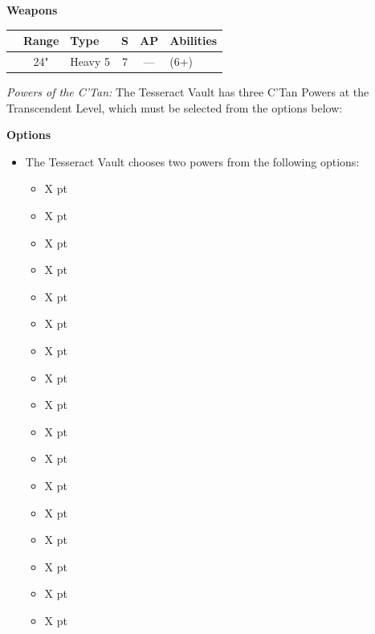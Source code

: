 \begin{minipage}[t]{0.72\textwidth}
	
	\vspace*{2em}
	\textbf{Weapons}
	
	\begin{tabular}{L{90 pt} c C{40pt} *{2}{c} >{\raggedright\arraybackslash}p{130pt}}
		& Range & Type & S & AP & Abilities \\
		\hline
		 & 24" & Heavy 5 & 7 & — &  (6+) \\
	\end{tabular}



	\textit{Powers of the C'Tan:} The Tesseract Vault has three C'Tan Powers at the Transcendent Level, which must be selected from the options below:
	
	\vspace*{2em}
	\textbf{Options}
	\begin{itemize}
		\item The Tesseract Vault chooses two powers from the following options:
		\begin{itemize}
			\item {} \dotfill X pt
			\item {} \dotfill X pt
			\item {} \dotfill X pt
			\item {} \dotfill X pt
			\item {} \dotfill X pt
			\item {} \dotfill X pt
			\item {} \dotfill X pt
			\item {} \dotfill X pt
			\item {} \dotfill X pt
			\item {} \dotfill X pt
			\item {} \dotfill X pt
			\item {} \dotfill X pt
			\item {} \dotfill X pt
			\item {} \dotfill X pt
			\item {} \dotfill X pt
			\item {} \dotfill X pt
			\item {} \dotfill X pt

\end{itemize}
\end{itemize}
\end{minipage}
